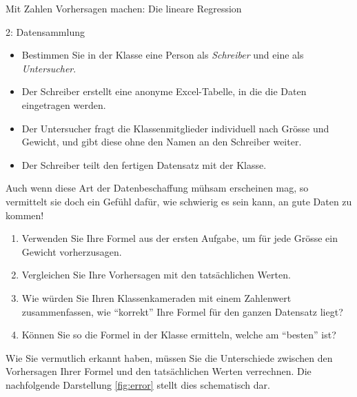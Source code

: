 \begin{lpu}{Mit Zahlen Vorhersagen machen: Die lineare Regression}
\begin{aufgabe}{2: Datensammlung}
\begin{itemize}
  \item Bestimmen Sie in der Klasse eine Person als \emph{Schreiber} und eine als \emph{Untersucher}.
  \item Der Schreiber erstellt eine anonyme Excel-Tabelle, in die die Daten eingetragen werden.
  \item Der Untersucher fragt die Klassenmitglieder individuell nach Grösse und Gewicht, und gibt diese ohne den Namen an den Schreiber weiter.
  \item Der Schreiber teilt den fertigen Datensatz mit der Klasse.
\end{itemize}
\end{aufgabe}

Auch wenn diese Art der Datenbeschaffung mühsam erscheinen mag, so vermittelt sie doch ein Gefühl dafür, wie schwierig es sein kann, an gute Daten zu kommen!

\begin{aufgabe}{3}
\begin{enumerate}
    \item Verwenden Sie Ihre Formel aus der ersten Aufgabe, um für jede Grösse ein Gewicht vorherzusagen. 
    \item Vergleichen Sie Ihre Vorhersagen mit den tatsächlichen Werten.
    \item Wie würden Sie Ihren Klassenkameraden mit einem Zahlenwert zusammenfassen, wie ``korrekt'' Ihre Formel für den ganzen Datensatz liegt? 
    \item Können Sie so die Formel in der Klasse ermitteln, welche am ``besten'' ist?
\end{enumerate}
\end{aufgabe}

Wie Sie vermutlich erkannt haben, müssen Sie die Unterschiede zwischen den Vorhersagen Ihrer Formel und den tatsächlichen Werten verrechnen. Die nachfolgende Darstellung \ref{fig:error} stellt dies schematisch dar.

\begin{figure}[h]
\centering
{}
\end{figure}
\end{lpu}
